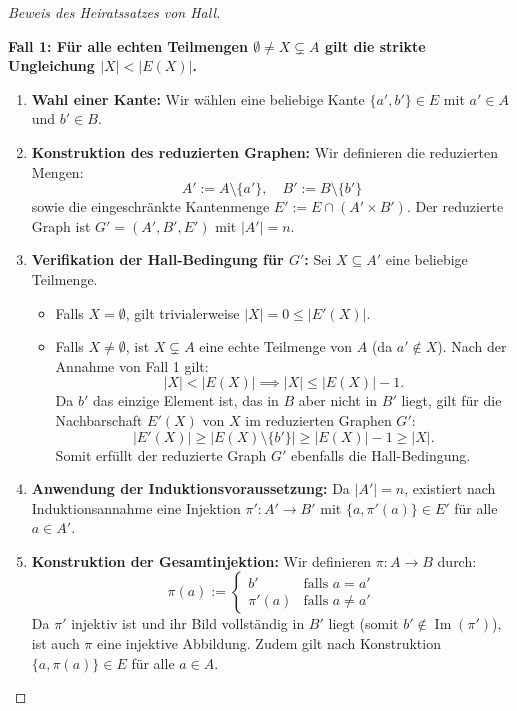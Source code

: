 \begin{proof}[Beweis des Heiratssatzes von Hall]
\begin{math-stroke}
\textbf{Fall 1: Für alle echten Teilmengen $\emptyset \neq X \subsetneq A$ gilt die strikte Ungleichung $|X| < |E(X)|$.}
\begin{enumerate}[label=\textbf{(\arabic*)}]
    \item \textbf{Wahl einer Kante:} Wir wählen eine beliebige Kante $\{a', b'\} \in E$ mit $a' \in A$ und $b' \in B$.
    \item \textbf{Konstruktion des reduzierten Graphen:} Wir definieren die reduzierten Mengen:
    \[
    A' := A \setminus \{a'\}, \quad B' := B \setminus \{b'\}
    \]
    sowie die eingeschränkte Kantenmenge $E' := E \cap (A' \times B')$. Der reduzierte Graph ist $G' = (A', B', E')$ mit $|A'| = n$.
    \item \textbf{Verifikation der Hall-Bedingung für $G'$:} Sei $X \subseteq A'$ eine beliebige Teilmenge.
    \begin{itemize}
        \item Falls $X = \emptyset$, gilt trivialerweise $|X| = 0 \le |E'(X)|$.
        \item Falls $X \neq \emptyset$, ist $X \subsetneq A$ eine echte Teilmenge von $A$ (da $a' \notin X$). Nach der Annahme von Fall 1 gilt:
        \[
        |X| < |E(X)| \implies |X| \le |E(X)| - 1.
        \]
        Da $b'$ das einzige Element ist, das in $B$ aber nicht in $B'$ liegt, gilt für die Nachbarschaft $E'(X)$ von $X$ im reduzierten Graphen $G'$:
        \[
        |E'(X)| \ge |E(X) \setminus \{b'\}| \ge |E(X)| - 1 \ge |X|.
        \]
        Somit erfüllt der reduzierte Graph $G'$ ebenfalls die Hall-Bedingung.
    \end{itemize}
    \item \textbf{Anwendung der Induktionsvoraussetzung:} Da $|A'| = n$, existiert nach Induktionsannahme eine Injektion $\pi' \colon A' \to B'$ mit $\{a, \pi'(a)\} \in E'$ für alle $a \in A'$.
    \item \textbf{Konstruktion der Gesamtinjektion:} Wir definieren $\pi \colon A \to B$ durch:
    \[
    \pi(a) := \begin{cases}
    b' & \text{falls } a = a' \\
    \pi'(a) & \text{falls } a \neq a'
    \end{cases}
    \]
    Da $\pi'$ injektiv ist und ihr Bild vollständig in $B'$ liegt (somit $b' \notin \operatorname{Im}(\pi')$), ist auch $\pi$ eine injektive Abbildung. Zudem gilt nach Konstruktion $\{a, \pi(a)\} \in E$ für alle $a \in A$.
\end{enumerate}
        

\end{math-stroke}
\end{proof}
